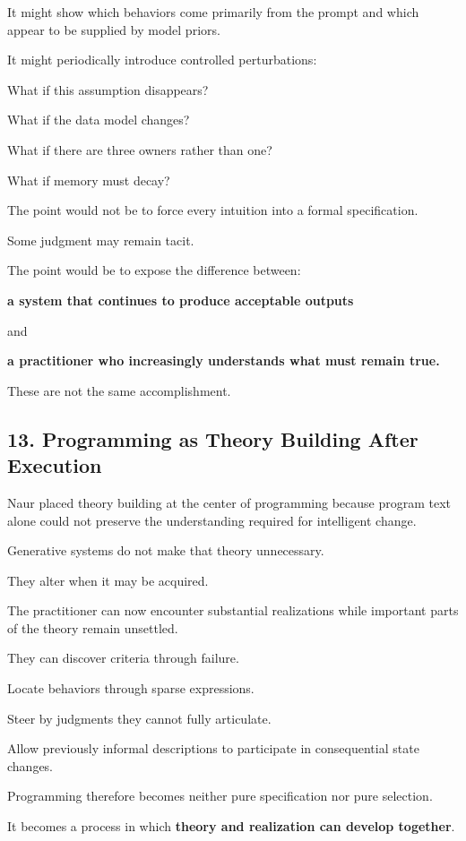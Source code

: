 \documentclass[
]{article}
\begin{document}
It might show which behaviors come primarily from the prompt and which
appear to be supplied by model priors.

It might periodically introduce controlled perturbations:

What if this assumption disappears?

What if the data model changes?

What if there are three owners rather than one?

What if memory must decay?

The point would not be to force every intuition into a formal
specification.

Some judgment may remain tacit.

The point would be to expose the difference between:

\textbf{a system that continues to produce acceptable outputs}

and

\textbf{a practitioner who increasingly understands what must remain
true.}

These are not the same accomplishment.

\subsection{13. Programming as Theory Building After
Execution}\label{programming-as-theory-building-after-execution}

Naur placed theory building at the center of programming because program
text alone could not preserve the understanding required for intelligent
change.

Generative systems do not make that theory unnecessary.

They alter when it may be acquired.

The practitioner can now encounter substantial realizations while
important parts of the theory remain unsettled.

They can discover criteria through failure.

Locate behaviors through sparse expressions.

Steer by judgments they cannot fully articulate.

Allow previously informal descriptions to participate in consequential
state changes.

Programming therefore becomes neither pure specification nor pure
selection.

It becomes a process in which \textbf{theory and realization can develop
together}.
\end{document}
